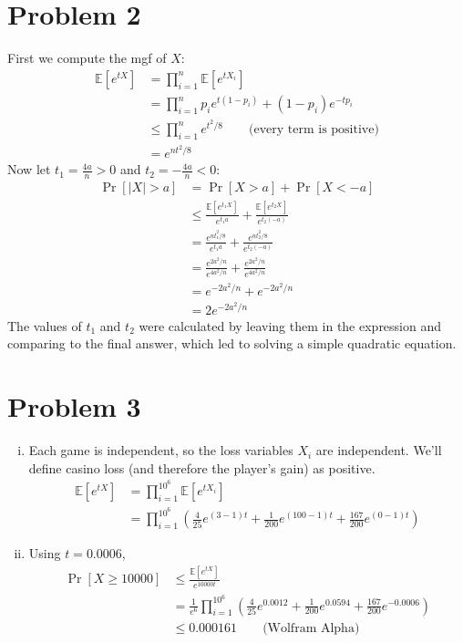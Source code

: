 \documentclass[11pt]{article}
\newcommand{\E}{\mathbb{E}}
\begin{document}
\newpage
\section*{Problem 2}
First we compute the mgf of $X$: \begin{align*}
\E[e^{tX}] &= \prod_{i=1}^n\E[e^{tX_i}]\\
&= \prod_{i=1}^np_ie^{t(1-p_i)}+(1-p_i)e^{-tp_i}\\
&\leq \prod_{i=1}^ne^{t^2/8} \qquad\text{(every term is positive)}\\
&= e^{nt^2/8}
\end{align*}
Now let $t_1=\frac{4a}n>0$ and $t_2=-\frac{4a}n<0$: \begin{align*}
\Pr[|X|>a] &= \Pr[X>a]+\Pr[X<-a]\\
&\leq \frac{\E[e^{t_1X}]}{e^{t_1a}}+\frac{\E[e^{t_2X}]}{e^{t_2(-a)}}\\
&= \frac{e^{nt_1^2/8}}{e^{t_1a}}+\frac{e^{nt_2^2/8}}{e^{t_2(-a)}}\\
&= \frac{e^{2a^2/n}}{e^{4a^2/n}}+\frac{e^{2a^2/n}}{e^{4a^2/n}}\\
&= e^{-2a^2/n}+e^{-2a^2/n}\\
&= 2e^{-2a^2/n}
\end{align*}
The values of $t_1$ and $t_2$ were calculated by leaving them in the expression and comparing to the final answer, which led to solving a simple quadratic equation.

\newpage
\section*{Problem 3}
\begin{enumerate}[(i)]
\item Each game is independent, so the loss variables $X_i$ are independent. We'll define casino loss (and therefore the player's gain) as positive. \begin{align*}
\E[e^{tX}] &= \prod_{i=1}^{10^6} \E[e^{tX_i}]\\
&= \prod_{i=1}^{10^6} \left(\frac{4}{25}e^{(3-1)t}+\frac{1}{200}e^{(100-1)t}+\frac{167}{200}e^{(0-1)t}\right)
\end{align*}
\item Using $t=0.0006$, \begin{align*}
\Pr[X\geq 10000] &\leq \frac{\E[e^{tX}]}{e^{10000t}}\\
&= \frac1{e^6}\prod_{i=1}^{10^6} \left(\frac{4}{25}e^{0.0012}+\frac{1}{200}e^{0.0594}+\frac{167}{200}e^{-0.0006}\right)\\
&\leq 0.000161 \qquad \text{(Wolfram Alpha)}
\end{align*}
\end{enumerate}
\end{document}
